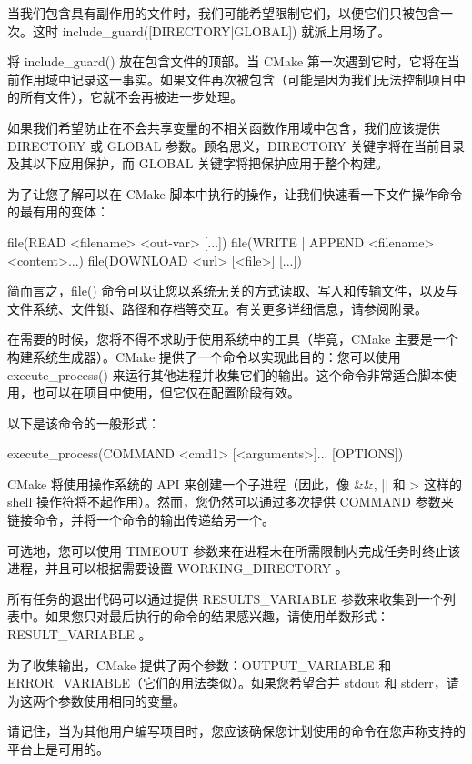 当我们包含具有副作用的文件时，我们可能希望限制它们，以便它们只被包含一次。这时 include\_guard([DIRECTORY|GLOBAL]) 就派上用场了。

将 include\_guard() 放在包含文件的顶部。当 CMake 第一次遇到它时，它将在当前作用域中记录这一事实。如果文件再次被包含（可能是因为我们无法控制项目中的所有文件），它就不会再被进一步处理。

如果我们希望防止在不会共享变量的不相关函数作用域中包含，我们应该提供 DIRECTORY 或 GLOBAL 参数。顾名思义，DIRECTORY 关键字将在当前目录及其以下应用保护，而 GLOBAL 关键字将把保护应用于整个构建。



为了让您了解可以在 CMake 脚本中执行的操作，让我们快速看一下文件操作命令的最有用的变体：

\begin{shell}
file(READ <filename> <out-var> [...])
file({WRITE | APPEND} <filename> <content>...)
file(DOWNLOAD <url> [<file>] [...])
\end{shell}

简而言之，file() 命令可以让您以系统无关的方式读取、写入和传输文件，以及与文件系统、文件锁、路径和存档等交互。有关更多详细信息，请参阅附录。


在需要的时候，您将不得不求助于使用系统中的工具（毕竟，CMake 主要是一个构建系统生成器）。CMake 提供了一个命令以实现此目的：您可以使用 execute\_process() 来运行其他进程并收集它们的输出。这个命令非常适合脚本使用，也可以在项目中使用，但它仅在配置阶段有效。

以下是该命令的一般形式：

\begin{shell}
execute_process(COMMAND <cmd1> [<arguments>]... [OPTIONS])
\end{shell}

CMake 将使用操作系统的 API 来创建一个子进程（因此，像 \&\&, || 和 > 这样的 shell 操作符将不起作用）。然而，您仍然可以通过多次提供 COMMAND 参数来链接命令，并将一个命令的输出传递给另一个。

可选地，您可以使用 TIMEOUT 参数来在进程未在所需限制内完成任务时终止该进程，并且可以根据需要设置 WORKING\_DIRECTORY 。

所有任务的退出代码可以通过提供 RESULTS\_VARIABLE 参数来收集到一个列表中。如果您只对最后执行的命令的结果感兴趣，请使用单数形式：RESULT\_VARIABLE 。

为了收集输出，CMake 提供了两个参数：OUTPUT\_VARIABLE 和 ERROR\_VARIABLE（它们的用法类似）。如果您希望合并 stdout 和 stderr，请为这两个参数使用相同的变量。

请记住，当为其他用户编写项目时，您应该确保您计划使用的命令在您声称支持的平台上是可用的。








